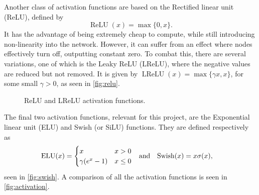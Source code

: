 \documentclass{article}
\theoremstyle{definition}
\begin{document}
Another class of activation functions are based on the Rectified linear unit (ReLU), defined by
\begin{equation*}
    \operatorname{ReLU}(x) = \max\{ 0, x \}.
\end{equation*}
It has the advantage of being extremely cheap to compute, while still introducing non-linearity into the network. However, it can suffer from an effect where nodes effectively turn off, outputting constant zero. To combat this, there are several variations, one of which is the Leaky ReLU (LReLU), where the negative values are reduced but not removed. It is given by $\operatorname{LReLU}(x) = \max\{ \gamma x, x\}$, for some small $\gamma > 0$, as seen in \autoref{fig:relu}.

\begin{figure}[H]%
    \centering
    \qquad
    \caption{ReLU and LReLU activation functions.}%
    \label{fig:relu}%
\end{figure}

The final two activation functions, relevant for this project, are the Exponential linear unit (ELU) and Swish (or SiLU) functions. They are defined respectively as
\begin{align*}
    \operatorname{ELU}(x) &=
    \begin{cases}
        x & x > 0 \\
        \gamma (e^x - 1) & x \leq 0
    \end{cases}
    &\textnormal{and}&&
    \operatorname{Swish}(x) &= x \sigma(x),
\end{align*}
seen in \autoref{fig:swish}. A comparison of all the activation functions is seen in \autoref{fig:activation}.
\end{document}
